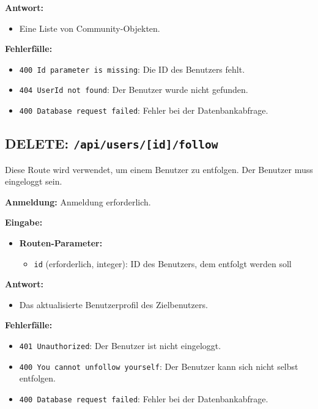 \documentclass[a4paper,12pt]{article}
\begin{document}
\textbf{Antwort:}
\begin{itemize}
    \item Eine Liste von Community-Objekten.
\end{itemize}

\textbf{Fehlerfälle:}
\begin{itemize}
    \item \texttt{400 Id parameter is missing}:
        Die ID des Benutzers fehlt.
    \item \texttt{404 UserId not found}:
        Der Benutzer wurde nicht gefunden.
    \item \texttt{400 Database request failed}:
        Fehler bei der Datenbankabfrage.
\end{itemize}

\subsection{DELETE: \texttt{/api/users/[id]/follow}}

Diese Route wird verwendet, um einem Benutzer zu entfolgen. Der Benutzer muss
eingeloggt sein.

\textbf{Anmeldung:} Anmeldung erforderlich.

\textbf{Eingabe:}
\begin{itemize}
    \item \textbf{Routen-Parameter:}
    \begin{itemize}
        \item \texttt{id} (erforderlich, integer):
            ID des Benutzers, dem entfolgt werden soll
    \end{itemize}
\end{itemize}

\textbf{Antwort:}
\begin{itemize}
    \item Das aktualisierte Benutzerprofil des Zielbenutzers.
\end{itemize}

\textbf{Fehlerfälle:}
\begin{itemize}
    \item \texttt{401 Unauthorized}:
        Der Benutzer ist nicht eingeloggt.
    \item \texttt{400 You cannot unfollow yourself}:
        Der Benutzer kann sich nicht selbst entfolgen.
    \item \texttt{400 Database request failed}:
        Fehler bei der Datenbankabfrage.
\end{itemize}
\end{document}
